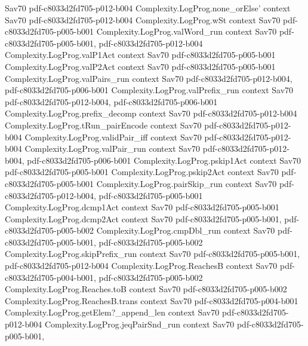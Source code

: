 \begin{theorem}
  {Sav70}
  {pdf-c8033d2fd705-p012-b004}
\proofstep
  {Complexity.LogProg.none_orElse'}
  {context}
  {Sav70}
  {pdf-c8033d2fd705-p012-b004}
\proofstep
  {Complexity.LogProg.wSt}
  {context}
  {Sav70}
  {pdf-c8033d2fd705-p005-b001}
\proofstep
  {Complexity.LogProg.valWord_run}
  {context}
  {Sav70}
  {pdf-c8033d2fd705-p005-b001,
    pdf-c8033d2fd705-p012-b004}
\proofstep
  {Complexity.LogProg.valP1Act}
  {context}
  {Sav70}
  {pdf-c8033d2fd705-p005-b001}
\proofstep
  {Complexity.LogProg.valP2Act}
  {context}
  {Sav70}
  {pdf-c8033d2fd705-p005-b001}
\proofstep
  {Complexity.LogProg.valPairs_run}
  {context}
  {Sav70}
  {pdf-c8033d2fd705-p012-b004,
    pdf-c8033d2fd705-p006-b001}
\proofstep
  {Complexity.LogProg.valPrefix_run}
  {context}
  {Sav70}
  {pdf-c8033d2fd705-p012-b004,
    pdf-c8033d2fd705-p006-b001}
\proofstep
  {Complexity.LogProg.prefix_decomp}
  {context}
  {Sav70}
  {pdf-c8033d2fd705-p012-b004}
\proofstep
  {Complexity.LogProg.tRun_pairEncode}
  {context}
  {Sav70}
  {pdf-c8033d2fd705-p012-b004}
\proofstep
  {Complexity.LogProg.validPair_iff}
  {context}
  {Sav70}
  {pdf-c8033d2fd705-p012-b004}
\proofstep
  {Complexity.LogProg.valPair_run}
  {context}
  {Sav70}
  {pdf-c8033d2fd705-p012-b004,
    pdf-c8033d2fd705-p006-b001}
\proofstep
  {Complexity.LogProg.pskip1Act}
  {context}
  {Sav70}
  {pdf-c8033d2fd705-p005-b001}
\proofstep
  {Complexity.LogProg.pskip2Act}
  {context}
  {Sav70}
  {pdf-c8033d2fd705-p005-b001}
\proofstep
  {Complexity.LogProg.pairSkip_run}
  {context}
  {Sav70}
  {pdf-c8033d2fd705-p012-b004,
    pdf-c8033d2fd705-p005-b001}
\proofstep
  {Complexity.LogProg.dcmp1Act}
  {context}
  {Sav70}
  {pdf-c8033d2fd705-p005-b001}
\proofstep
  {Complexity.LogProg.dcmp2Act}
  {context}
  {Sav70}
  {pdf-c8033d2fd705-p005-b001,
    pdf-c8033d2fd705-p005-b002}
\proofstep
  {Complexity.LogProg.cmpDbl_run}
  {context}
  {Sav70}
  {pdf-c8033d2fd705-p005-b001,
    pdf-c8033d2fd705-p005-b002}
\proofstep
  {Complexity.LogProg.skipPrefix_run}
  {context}
  {Sav70}
  {pdf-c8033d2fd705-p005-b001,
    pdf-c8033d2fd705-p012-b004}
\proofstep
  {Complexity.LogProg.ReachesB}
  {context}
  {Sav70}
  {pdf-c8033d2fd705-p004-b001,
    pdf-c8033d2fd705-p005-b002}
\proofstep
  {Complexity.LogProg.Reaches.toB}
  {context}
  {Sav70}
  {pdf-c8033d2fd705-p005-b002}
\proofstep
  {Complexity.LogProg.ReachesB.trans}
  {context}
  {Sav70}
  {pdf-c8033d2fd705-p004-b001}
\proofstep
  {Complexity.LogProg.getElem?_append_len}
  {context}
  {Sav70}
  {pdf-c8033d2fd705-p012-b004}
\proofstep
  {Complexity.LogProg.jeqPairSnd_run}
  {context}
  {Sav70}
  {pdf-c8033d2fd705-p005-b001,
}
\end{theorem}
